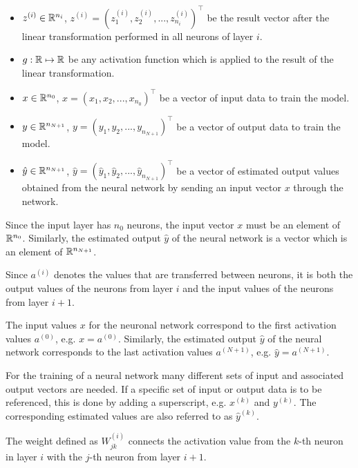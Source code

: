 \begin{itemize}
	\item $z^{(i)} \in \mathbb{R}^{n_i}$, $z^{(i)} = (z_1^{(i)}, z_2^{(i)}, ..., z_{n_i}^{(i)})^\top$ be the result vector after the linear transformation performed in all neurons of layer $i$.
	
	\item $g: \mathbb{R} \mapsto \mathbb{R}$ be any activation function which is applied to the result of the linear transformation. 
	
	\item $x \in \mathbb{R}^{n_0}$, $x = (x_1, x_2, ..., x_{n_0})^\top$ be a vector of input data to train the model. 
	
	\item $y \in \mathbb{R}^{n_{N+1}}$, $y = (y_1, y_2, ..., y_{n_{N+1}})^\top$ be a vector of output data to train the model. 
	
	\item $\hat{y} \in \mathbb{R}^{n_{N+1}}$, $\hat{y} = (\hat{y}_1, \hat{y}_2, ..., \hat{y}_{n_{N+1}})^\top$ be a vector of estimated output values obtained from the neural network by sending an input vector $x$ through the network. 
\end{itemize}

\begin{remark}
	Since the input layer has $n_0$ neurons, the input vector $x$ must be an element of $\mathbb{R}^{n_0}$. Similarly, the estimated output $\hat{y}$ of the neural network is a vector which is an element of $\mathbb{R}^{n_{N+1}}$.
\end{remark}

\begin{remark}
	Since $a^{(i)}$ denotes the values that are transferred between neurons, it is both the output values of the neurons from layer $i$ and the input values of the neurons from layer $i+1$. 
\end{remark}

\begin{remark}
	The input values $x$ for the neuronal network correspond to the first activation values $a^{(0)}$, e.g. $x = a^{(0)}$. Similarly, the estimated output $\hat{y}$ of the neural network corresponds to the last activation values $a^{(N+1)}$, e.g. $\hat{y} = a^{(N+1)}$.
\end{remark}

\begin{remark}
	For the training of a neural network many different sets of input and associated output vectors are needed.	If a specific set of input or output data is to be referenced, this is done by adding a superscript, e.g. $x^{(k)}$ and $y^{(k)}$. The corresponding estimated values are also referred to as $\hat{y}^{(k)}$. 
\end{remark}
\begin{remark}
	The weight defined as $W_{jk}^{(i)}$ connects the activation value from the $k$-th neuron in layer $i$ with the $j$-th neuron from layer $i + 1$.
\end{remark}

